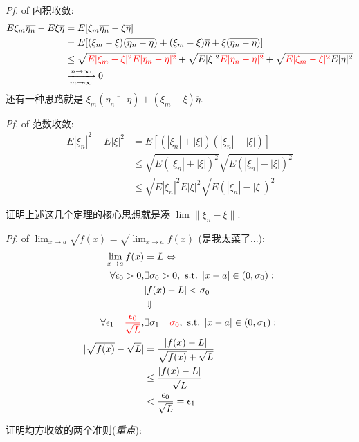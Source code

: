 \emph*{Pf.} of 内积收敛:
\begin{align*}
	E\xi_m\overline{\eta_n} - E\xi\overline{\eta} &= E[\xi_m\overline{\eta_n} - \xi\overline{\eta}] \\
	&= E[(\xi_m - \xi)(\overline{\eta_n - \eta}) + (\xi_m - \xi)\overline{\eta} + \xi(\overline{\eta_n - \eta})] \\
	&\le \sqrt{\textcolor{red}{E|\xi_m-\xi|^2E|\eta_n-\eta|^2}} + \sqrt{E|\xi|^2\textcolor{red}{E|\eta_n - \eta|^2}} + \sqrt{\textcolor{red}{E|\xi_m-\xi|^2}E|\eta|^2} \\
	&\xrightarrow[m\to\infty]{n\to\infty} 0
\end{align*}
还有一种思路就是 $\xi_m(\overline{\eta_n - \eta}) + (\xi_m - \xi)\overline{\eta}$.

\emph*{Pf.} of 范数收敛:
\begin{align*}
	E|\xi_n|^2 - E|\xi|^2 &= E[(|\xi_n| + |\xi|)(|\xi_n| - |\xi|)] \\
	&\le \sqrt{E(|\xi_n| + |\xi|)^2}\sqrt{E(|\xi_n| - |\xi|)^2} \\
	&\le \sqrt{E|\xi_n|^2E|\xi|^2}\sqrt{E(|\xi_n| - |\xi|)^2}
\end{align*}


证明上述这几个定理的核心思想就是凑 $\lim\lVert\xi_n-\xi\rVert$.

\emph*{Pf.} of $\lim_{x\to a}\sqrt{f(x)} = \sqrt{\lim_{x\to a} f(x)}$ (是我太菜了...):
\begin{align*}
	\lim_{x\to a} f(x) &= L \Leftrightarrow \\
	\forall \epsilon_0 > 0, &\exists \sigma_0 > 0, \text{ s.t. } |x-a| \in (0, \sigma_0): \\
	&|f(x) - L| < \sigma_0 \\
	&\Downarrow \\
	\forall \epsilon_1 \textcolor{red}{= \frac{\epsilon_0}{\sqrt{L}}}, &\exists \sigma_1 \textcolor{red}{= \sigma_0}, \text{ s.t. } |x-a|\in(0,\sigma_1): \\
	|\sqrt{f(x)} - \sqrt{L}| &= \frac{|f(x) - L|}{\sqrt{f(x)} + \sqrt{L}} \\
	&\le \frac{|f(x) - L|}{\sqrt{L}} \\
	&< \frac{\epsilon_0}{\sqrt{L}} = \epsilon_1
\end{align*}


证明均方收敛的两个准则(\emph{重点}):


